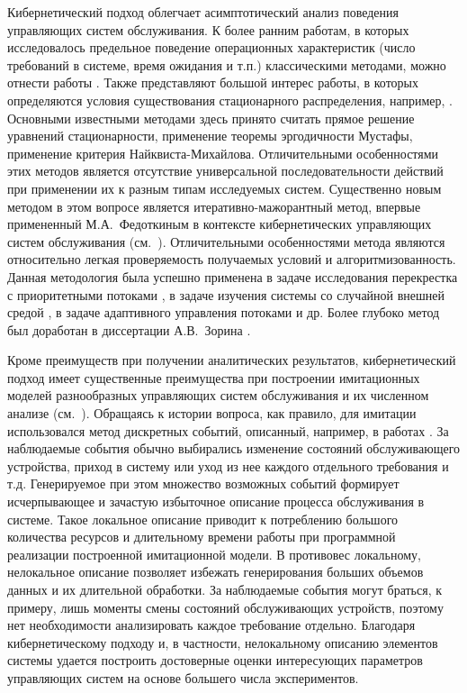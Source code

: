 Кибернетический подход облегчает асимптотический анализ поведения управляющих систем обслуживания. К более ранним работам, в которых исследовалось предельное поведение операционных характеристик (число требований в системе, время ожидания и т.п.) классическими методами, можно отнести работы \cite{Davis:1995, Borovrkov:1964, Borovrkov:1980, Afanasieva:2011,Afanasieva:2008, Whitt:1971, Whitt:1982}. Также представляют большой интерес работы, в которых определяются условия существования стационарного распределения, например, \cite{Loynes:1962, Davis:1972, Whitt:2014, Choudhury:1995}. Основными известными методами здесь принято считать прямое решение уравнений стационарности, применение теоремы эргодичности Мустафы, применение критерия Найквиста-Михайлова. Отличительными особенностями этих методов является отсутствие универсальной последовательности действий при применении их к разным типам исследуемых систем. Существенно новым методом в этом вопросе является итеративно-мажорантный метод, впервые примененный М.А.~Федоткиным в контексте кибернетических управляющих систем обслуживания (см.~\cite{Fedotkin:1988, Fedotkin:1989}). Отличительными особенностями метода являются относительно легкая проверяемость получаемых условий и алгоритмизованность. Данная методология была успешно применена в задаче исследования перекрестка с приоритетными потоками \cite{Proidakova:2007}, в задаче изучения системы со случайной внешней средой \cite{Zorin:2008:1}, в задаче адаптивного управления потоками \cite{LitvakDissertation} и др. Более глубоко метод был доработан в диссертации А.В.~Зорина \cite{ZorineDissertation}. 

Кроме преимуществ при получении аналитических результатов,  кибернетический подход имеет существенные преимущества  при построении имитационных моделей разнообразных управляющих систем обслуживания и их численном анализе (см.~\cite{Zorine:2013}). Обращаясь к истории вопроса, как правило, для имитации использовался метод дискретных событий, описанный, например, в работах \cite{Simulation, AsmussenGlynn, FedotkinRachinskaya:2016, FedotkinADissertation}. За наблюдаемые события обычно выбирались изменение состояний обслуживающего устройства, приход в систему или уход из нее каждого отдельного требования и т.д. Генерируемое при этом множество возможных событий формирует исчерпывающее и зачастую избыточное описание процесса обслуживания в системе. Такое локальное описание приводит к потреблению большого количества ресурсов и длительному времени работы при программной реализации построенной имитационной модели. В противовес локальному, нелокальное описание позволяет избежать генерирования больших объемов данных и их длительной обработки. За наблюдаемые события могут браться, к примеру, лишь моменты смены состояний обслуживающих устройств, поэтому нет необходимости анализировать каждое требование отдельно. Благодаря кибернетическому подходу и, в частности, нелокальному описанию элементов системы удается построить достоверные оценки интересующих параметров управляющих систем на основе большего числа экспериментов.




